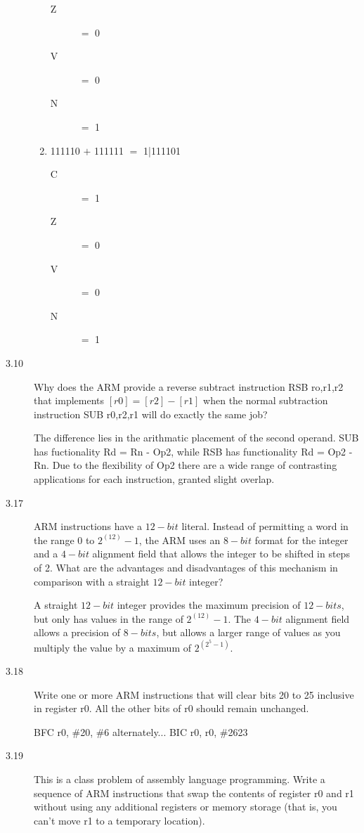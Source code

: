 \documentclass[letterpaper,10pt,titlepage]{article}
\begin{document}
\begin{description}
\begin{enumerate}
\begin{description}
            \item[Z] $=$ 0
            \item[V] $=$ 0
            \item[N] $=$ 1
        \end{description}
        \item 111110 $+$ 111111 $=$ 1|111101
        \begin{description}
            \item[C] $=$ 1
            \item[Z] $=$ 0
            \item[V] $=$ 0
            \item[N] $=$ 1
        \end{description}
    \end{enumerate}
    \item[3.10] Why does the ARM provide a reverse subtract instruction RSB ro,r1,r2 that implements $[r0] = [r2] - [r1]$ when the normal subtraction instruction SUB r0,r2,r1 will do exactly the same job?
    
    The difference lies in the arithmatic placement of the second operand. SUB has fuctionality Rd = Rn - Op2, while RSB has functionality Rd = Op2 - Rn. Due to the flexibility of Op2 there are a wide range of contrasting applications for each instruction, granted slight overlap.
    \item[3.17] ARM instructions have a $12-bit$ literal. Instead of permitting a word in the range 0 to $2^(12) - 1$, the ARM uses an $8-bit$ format for the integer and a $4-bit$ alignment field that allows the integer to be shifted in steps of 2. What are the advantages and disadvantages of this mechanism in comparison with a straight $12-bit$ integer?
    
    A straight $12-bit$ integer provides the maximum precision of $12-bits$, but only has values in the range of $2^(12) - 1$. The $4-bit$ alignment field allows a precision of $8-bits$, but allows a larger range of values as you multiply the value by a maximum of $2^(2^5 - 1)$.
    \item[3.18] Write one or more ARM instructions that will clear bits 20 to 25 inclusive in register r0. All the other bits of r0 should remain unchanged.
    
    BFC r0, \#20, \#6
    alternately...
    BIC r0, r0, \#2623
    \item[3.19] This is a class problem of assembly language programming. Write a sequence of ARM instructions that swap the contents of register r0 and r1 without using any additional registers or memory storage (that is, you can't move r1 to a temporary location).
    

\end{description}
\end{document}
